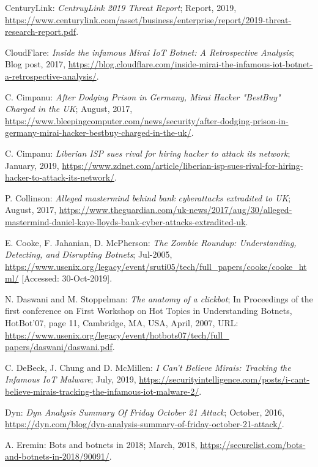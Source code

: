 \begin{thebibliography}{99}
  CenturyLink: \emph{CentruyLink 2019 Threat Report}; Report, 2019, \url{https://www.centurylink.com/asset/business/enterprise/report/2019-threat-research-report.pdf}.

 CloudFlare: \emph{Inside the infamous Mirai IoT Botnet: A Retrospective Analysis}; Blog post, 2017, \url{https://blog.cloudflare.com/inside-mirai-the-infamous-iot-botnet-a-retrospective-analysis/}.

 C. Cimpanu: \emph{After Dodging Prison in Germany, Mirai Hacker "BestBuy" Charged in the UK}; August, 2017, \url{https://www.bleepingcomputer.com/news/security/after-dodging-prison-in-germany-mirai-hacker-bestbuy-charged-in-the-uk/}.

 C. Cimpanu: \emph{Liberian ISP sues rival for hiring hacker to attack its network}; January, 2019, \url{https://www.zdnet.com/article/liberian-isp-sues-rival-for-hiring-hacker-to-attack-its-network/}.

 P. Collinson: \emph{Alleged mastermind behind bank cyberattacks extradited to UK}; August, 2017, \url{https://www.theguardian.com/uk-news/2017/aug/30/alleged-mastermind-daniel-kaye-lloyds-bank-cyber-attacks-extradited-uk}.

 E. Cooke, F. Jahanian, D. McPherson: \emph{The Zombie Roundup: Understanding, Detecting, and Disrupting Botnets}; Jul-2005, \url{https://www.usenix.org/legacy/event/sruti05/tech/full_papers/cooke/cooke_html/} [Accessed: 30-Oct-2019].

 N. Daswani and M. Stoppelman: \emph{The anatomy of a clickbot}; In Proceedings of the first conference on First Workshop on Hot Topics in Understanding Botnets, HotBot'07, page 11, Cambridge, MA, USA, April, 2007, URL: \url{https://www.usenix.org/legacy/event/hotbots07/tech/full_ papers/daswani/daswani.pdf}.

 C. DeBeck, J. Chung and D. McMillen: \emph{I Can't Believe Mirais: Tracking the Infamous IoT Malware}; July, 2019, \url{https://securityintelligence.com/posts/i-cant-believe-mirais-tracking-the-infamous-iot-malware-2/}.

 Dyn: \emph{Dyn Analysis Summary Of Friday October 21 Attack}; October, 2016, \url{https://dyn.com/blog/dyn-analysis-summary-of-friday-october-21-attack/}.

  A. Eremin: Bots and botnets in 2018; March, 2018, \url{https://securelist.com/bots-and-botnets-in-2018/90091/}.


\end{thebibliography}
